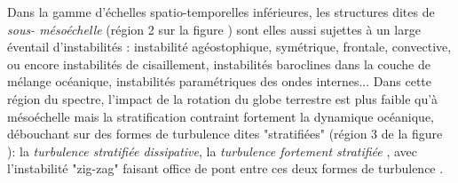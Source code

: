 


Dans la gamme d'échelles spatio-temporelles inférieures, les structures dites de \textit{sous- mésoéchelle} (région 2 sur la figure ) sont elles aussi sujettes à un large éventail d'instabilités \citep{mcwilliams_submesoscale_2016}: instabilité agéostophique, symétrique, frontale, convective, ou encore instabilités de cisaillement, instabilités baroclines dans la couche de mélange océanique, instabilités paramétriques des ondes internes... Dans cette région du spectre, l'impact de la rotation du globe terrestre est plus faible qu'à mésoéchelle mais la stratification contraint fortement la dynamique océanique, débouchant sur des formes de turbulence dites "stratifiées" (région 3 de la figure ): la \textit{turbulence stratifiée dissipative}, la \textit{turbulence fortement stratifiée} \citep{augier_turbulence_2012}, avec l'instabilité "zig-zag" faisant office de pont entre ces deux formes de turbulence \citep{billant_zigzag_2010}.

